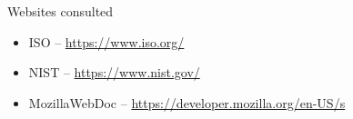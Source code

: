 \cleardoublepage
{}
{}
\printbibliography[title=References]
\nocite{*}
\vspace{2.5cm}
\begin{Large}Websites consulted\end{Large}
\begin{itemize}
\item ISO -- \url{https://www.iso.org/}
\item NIST -- \url{https://www.nist.gov/}
\item MozillaWebDoc -- \url{https://developer.mozilla.org/en-US/s}
\end{itemize}

